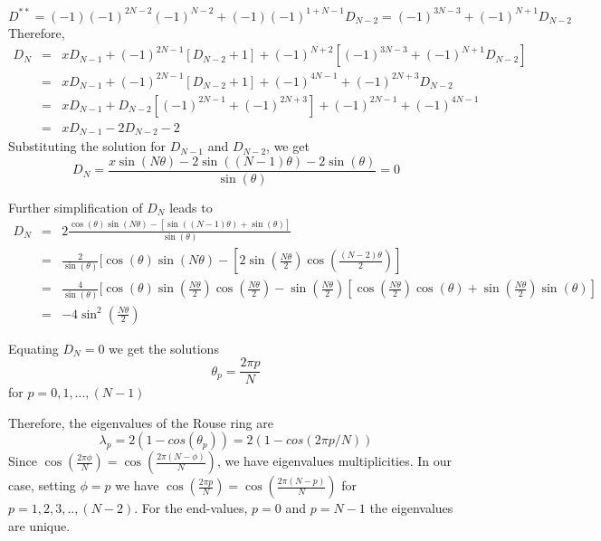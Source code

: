 \documentclass{paper}
\begin{document}
\begin{equation*}
D^{**}=(-1)(-1)^{2N-2}(-1)^{N-2} +(-1)(-1)^{1+N-1}D_{N-2}=(-1)^{3N-3}+(-1)^{N+1}D_{N-2}
\end{equation*}
Therefore, 
\begin{eqnarray*}
D_N & = & xD_{N-1} + (-1)^{2N-1}[D_{N-2}+1]+(-1)^{N+2}[(-1)^{3N-3}+(-1)^{N+1}D_{N-2}]\\
    & = & xD_{N-1} + (-1)^{2N-1}[D_{N-2}+1]+(-1)^{4N-1}+(-1)^{2N+3}D_{N-2}\\
    & = & xD_{N-1} + D_{N-2}[(-1)^{2N-1}+(-1)^{2N+3}]+(-1)^{2N-1}+(-1)^{4N-1}\\
    & = & xD_{N-1} - 2D_{N-2}-2
\end{eqnarray*}
Substituting the solution for $D_{N-1}$ and $D_{N-2}$, we get 
\begin{equation*}
D_N = \frac{x\sin(N\theta)-2\sin((N-1)\theta)-2\sin(\theta)}{\sin(\theta)}=0
\end{equation*}

Further simplification of $D_N$ leads to 
\begin{eqnarray*}
D_N &=& 2\frac{\cos(\theta)\sin(N\theta)-[\sin((N-1)\theta)+\sin(\theta)]}{\sin(\theta)}\\
    &=& \frac{2}{\sin(\theta)}[\cos(\theta)\sin(N\theta)-[2\sin(\frac{N\theta}{2})\cos(\frac{(N-2)\theta}{2})]\\
    &=& \frac{4}{\sin(\theta)}[\cos(\theta)\sin(\frac{N\theta}{2})\cos(\frac{N\theta}{2})-\sin(\frac{N\theta}{2})[\cos(\frac{N\theta}{2})\cos(\theta)+\sin(\frac{N\theta}{2})\sin(\theta)]\\
    &=& -4\sin^2(\frac{N\theta}{2})
\end{eqnarray*}

Equating $D_N=0$ we get the solutions
\begin{equation*}
\theta_p=\frac{2\pi p}{N}
\end{equation*}
for $p=0,1,...,(N-1)$

Therefore, the eigenvalues of the Rouse ring are 
\begin{equation*}
\lambda_p=2(1-cos(\theta_p))= 2(1-cos(2\pi p/N))
\end{equation*}
Since $\cos(\frac{2\pi \phi}{N})=\cos(\frac{2\pi(N-\phi)}{N})$, we have eigenvalues multiplicities. In our case, setting $\phi=p$ we have $\cos(\frac{2\pi p}{N})=\cos(\frac{2\pi(N-p)}{N})$ for $p=1,2,3,..,(N-2)$. For the end-values, $p=0$ and $p=N-1$ the eigenvalues are unique. 
\end{document}
